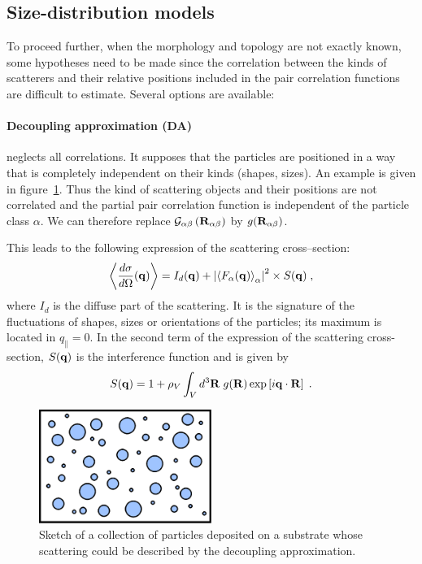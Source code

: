 \subsection{Size-distribution models}

To proceed further, when the morphology and topology are not exactly known, some hypotheses need to be made since the correlation between the kinds of scatterers and their relative positions included in the pair correlation functions are difficult to estimate. Several options are available:

\paragraph{Decoupling approximation (DA)} neglects all correlations. It supposes that the particles are positioned in a way that is completely independent on their kinds (shapes, sizes). An example is given in figure~\ref{fig:da}. Thus the kind of scattering objects and their positions are not correlated and the partial pair correlation function is independent of the particle class $\alpha$. We can therefore replace $ \mathcal{G}_{\alpha \beta}\left( \mathbf{R}_{\alpha \beta} \right)$ by  $g(\mathbf{R}_{\alpha\beta})$.

This leads to the following expression of the scattering cross--section:
\begin{equation*}
\left\langle \frac{d\sigma}{d\Omega}(\mathbf{q}) \right\rangle  = I_d(\mathbf{q}) + \left\lvert \left\langle F_\alpha(\mathbf{q}) \right\rangle_\alpha \right\rvert ^2 \times S(\mathbf{q}) \; ,
\end{equation*}
where $I_d$ is the diffuse part of the scattering. It is the signature of the fluctuations of shapes, sizes or orientations of the particles; its maximum is located in $q_{\parallel}=0$. In the second term of the expression of the scattering cross-section, $S(\mathbf{q})$ is the interference function and is given by
\begin{equation*} 
  S(\mathbf{q}) = 1+ \rho_V \int_V d^3\mathbf{R} \; g(\mathbf{R}) \exp \left[ i\mathbf{q}\cdot \mathbf{R} \right] \; .
\end{equation*}


\begin{figure}[ht]
\begin{center}
\includegraphics[width=0.5\textwidth]{Figures/drawing/drawingDA.eps}
\end{center}
\caption{Sketch of a collection of particles deposited on a substrate whose scattering  could be described by the decoupling approximation.}
\label{fig:da}
\end{figure}


